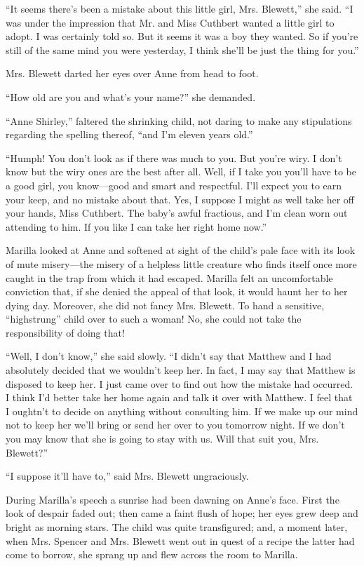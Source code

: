 \documentclass[a4paper]{article}
\begin{document}
``It seems there's been a mistake about this little girl, Mrs. Blewett,'' she said. ``I was under the impression that Mr. and Miss Cuthbert wanted a little girl to adopt. I was certainly told so. But it seems it was a boy they wanted. So if you're still of the same mind you were yesterday, I think she'll be just the thing for you.''

Mrs. Blewett darted her eyes over Anne from head to foot.

``How old are you and what's your name?'' she demanded.

``Anne Shirley,'' faltered the shrinking child, not daring to make any stipulations regarding the spelling thereof, ``and I'm eleven years old.''

``Humph! You don't look as if there was much to you. But you're wiry. I don't know but the wiry ones are the best after all. Well, if I take you you'll have to be a good girl, you know---good and smart and respectful. I'll expect you to earn your keep, and no mistake about that. Yes, I suppose I might as well take her off your hands, Miss Cuthbert. The baby's awful fractious, and I'm clean worn out attending to him. If you like I can take her right home now.''

Marilla looked at Anne and softened at sight of the child's pale face with its look of mute misery---the misery of a helpless little creature who finds itself once more caught in the trap from which it had escaped. Marilla felt an uncomfortable conviction that, if she denied the appeal of that look, it would haunt her to her dying day. Moreover, she did not fancy Mrs. Blewett. To hand a sensitive, ``highstrung'' child over to such a woman! No, she could not take the responsibility of doing that!

``Well, I don't know,'' she said slowly. ``I didn't say that Matthew and I had absolutely decided that we wouldn't keep her. In fact, I may say that Matthew is disposed to keep her. I just came over to find out how the mistake had occurred. I think I'd better take her home again and talk it over with Matthew. I feel that I oughtn't to decide on anything without consulting him. If we make up our mind not to keep her we'll bring or send her over to you tomorrow night. If we don't you may know that she is going to stay with us. Will that suit you, Mrs. Blewett?''

``I suppose it'll have to,'' said Mrs. Blewett ungraciously.

During Marilla's speech a sunrise had been dawning on Anne's face. First the look of despair faded out; then came a faint flush of hope; her eyes grew deep and bright as morning stars. The child was quite transfigured; and, a moment later, when Mrs. Spencer and Mrs. Blewett went out in quest of a recipe the latter had come to borrow, she sprang up and flew across the room to Marilla.
\end{document}
